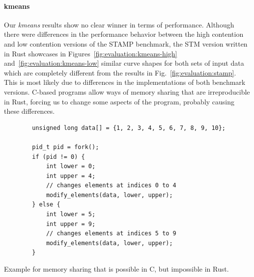\paragraph{kmeans} Our \emph{kmeans} results show no clear winner in terms of performance.
Although there were differences in the performance behavior between the high contention and low contention versions of the STAMP benchmark, the STM version written in Rust showcases in Figures~\ref{fig:evaluation:kmeans-high} and~\ref{fig:evaluation:kmeans-low} similar curve shapes for both sets of input data which are completely different from the results in Fig.~\ref{fig:evaluation:stamp}.
This is most likely due to differences in the implementations of both benchmark versions.
C-based programs allow ways of memory sharing that are irreproducible in Rust, forcing us to change some aspects of the program, probably causing these differences.

\begin{listing}
    \begin{verbatim}
        unsigned long data[] = {1, 2, 3, 4, 5, 6, 7, 8, 9, 10};

        pid_t pid = fork();
        if (pid != 0) {
            int lower = 0;
            int upper = 4;
            // changes elements at indices 0 to 4
            modify_elements(data, lower, upper);
        } else {
            int lower = 5;
            int upper = 9;
            // changes elements at indices 5 to 9
            modify_elements(data, lower, upper);
        }
    \end{verbatim}
    \caption{Example for memory sharing that is possible in C, but impossible in Rust.}%
    \label{fig:evaluation:sharing}
\end{listing}

